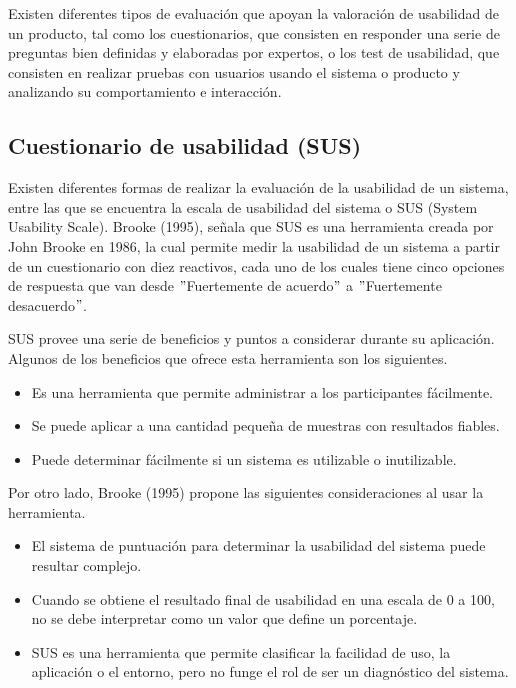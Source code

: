 Existen diferentes tipos de evaluación que apoyan la valoración de usabilidad de un producto, tal como los cuestionarios, que consisten en responder una serie de preguntas bien definidas y elaboradas por expertos, o los test de usabilidad, que consisten en realizar pruebas con usuarios usando el sistema o producto y analizando su comportamiento e interacción.


\subsection{Cuestionario de usabilidad (SUS)}
\label{SUSCap3}

Existen diferentes formas de realizar la evaluación de la usabilidad de un sistema, entre las que se encuentra la escala de usabilidad del sistema o SUS (System Usability Scale). Brooke (1995), señala que SUS es una herramienta creada por John Brooke en 1986, la cual permite medir la usabilidad de un sistema a partir de un cuestionario con diez reactivos, cada uno de los cuales tiene cinco opciones de respuesta que van desde $"$Fuertemente de acuerdo$"$ a $"$Fuertemente desacuerdo$"$.

SUS provee una serie de beneficios y puntos a considerar durante su aplicación. Algunos de los beneficios que ofrece esta herramienta son los siguientes.

\begin{itemize}
  \item Es una herramienta que permite administrar a los participantes fácilmente.
  \item Se puede aplicar a una cantidad pequeña de muestras con resultados fiables.
  \item Puede determinar fácilmente si un sistema es utilizable o inutilizable.
\end{itemize}

Por otro lado, Brooke (1995) propone las siguientes consideraciones al usar la herramienta.

\begin{itemize}
  \item El sistema de puntuación para determinar la usabilidad del sistema puede resultar complejo.
  \item Cuando se obtiene el resultado final de usabilidad en una escala de 0 a 100, no se debe interpretar como un valor que define un porcentaje.
  \item SUS es una herramienta que permite clasificar la facilidad de uso, la aplicación o el entorno, pero no funge el rol de ser un diagnóstico del sistema.
\end{itemize}

